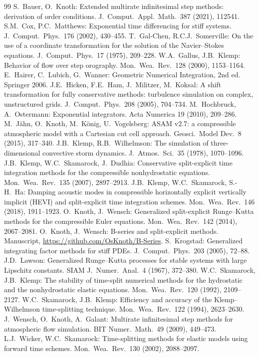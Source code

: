 \documentclass[11pt,a4paper]{article}
\begin{document}
\begin{thebibliography}{99}
 S.~Bauer, O.~Knoth: Extended multirate infinitesimal step methods: derivation of order
conditions. J.\ Comput.\ Appl.\ Math.\ 387 (2021), 112541.
 S.M.~Cox, P.C.~Matthews: Exponential time differencing for stiff systems.
J.\ Comput.\ Phys.\ 176 (2002), 430--455.
 T.~Gal-Chen, R.C.J.~Somerville: On the use of a coordinate transformation for the
solution of the Navier--Stokes equations. J.\ Comput.\ Phys.\ 17 (1975), 209--228.
 W.A.~Gallus, J.B.~Klemp: Behavior of flow over step orography. Mon.\ Wea.\ Rev.\ 128
(2000), 1153--1164.
 E.~Hairer, C.~Lubich, G.~Wanner: Geometric Numerical Integration, 2nd ed. Springer 2006.
 J.E.~Hicken, F.E.~Ham, J.~Militzer, M.~Koksal: A shift transformation for fully conservative
methods: turbulence simulation on complex, unstructured grids. J.\ Comput.\ Phys.\ 208 (2005), 704--734.
 M.~Hochbruck, A.~Ostermann: Exponential integrators. Acta Numerica 19 (2010), 209--286.
 M.~J\"ahn, O.~Knoth, M.~K\"onig, U.~Vogelsberg: ASAM v2.7: a compressible atmospheric
model with a Cartesian cut cell approach. Geosci.\ Model Dev.\ 8 (2015), 317--340.
 J.B.~Klemp, R.B.~Wilhelmson: The simulation of three-dimensional convective storm
dynamics. J.\ Atmos.\ Sci.\ 35 (1978), 1070--1096.
 J.B.~Klemp, W.C.~Skamarock, J.~Dudhia: Conservative split-explicit time integration methods
for the compressible nonhydrostatic equations. Mon.\ Wea.\ Rev.\ 135 (2007), 2897--2913.
 J.B.~Klemp, W.C.~Skamarock, S.-H.~Ha: Damping acoustic modes in compressible horizontally
explicit vertically implicit (HEVI) and split-explicit time integration schemes. Mon.\ Wea.\ Rev.\ 146
(2018), 1911--1923.
 O.~Knoth, J.~Wensch: Generalized split-explicit Runge--Kutta methods for the
compressible Euler equations. Mon.\ Wea.\ Rev.\ 142 (2014), 2067--2081.
 O.~Knoth, J.~Wensch: B-series and split-explicit methods. Manuscript,
\url{https://github.com/OsKnoth/B-Series}.
 S.~Krogstad: Generalized integrating factor methods for stiff PDEs. J.\ Comput.\ Phys.\
203 (2005), 72--88.
 J.D.~Lawson: Generalized Runge--Kutta processes for stable systems with large Lipschitz
constants. SIAM J.\ Numer.\ Anal.\ 4 (1967), 372--380.
 W.C.~Skamarock, J.B.~Klemp: The stability of time-split numerical methods for the
hydrostatic and the nonhydrostatic elastic equations. Mon.\ Wea.\ Rev.\ 120 (1992), 2109--2127.
\bibitem{sk94} W.C.~Skamarock, J.B.~Klemp: Efficiency and accuracy of the Klemp--Wilhelmson
time-splitting technique. Mon.\ Wea.\ Rev.\ 122 (1994), 2623--2630.
\bibitem{wkg} J.~Wensch, O.~Knoth, A.~Galant: Multirate infinitesimal step methods for atmospheric flow
simulation. BIT Numer.\ Math.\ 49 (2009), 449--473.
 L.J.~Wicker, W.C.~Skamarock: Time-splitting methods for elastic models using forward time
schemes. Mon.\ Wea.\ Rev.\ 130 (2002), 2088--2097.
\end{thebibliography}
\end{document}
